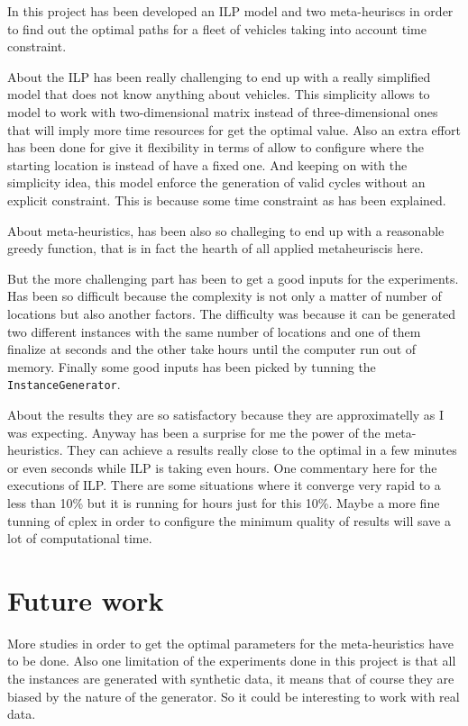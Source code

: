 \documentclass[]{report}
\begin{document}
In this project has been developed an ILP model and two meta-heuriscs in order to find out the optimal paths for a fleet of vehicles taking into account time constraint.

About the ILP has been really challenging to end up with a really simplified model that does not know anything about vehicles. This simplicity allows to model to work with two-dimensional matrix instead of three-dimensional ones that will imply more time resources for get the optimal value. Also an extra effort has been done for give it flexibility in terms of allow to configure where the starting location is instead of have a fixed one. And keeping on with the simplicity idea, this model enforce the generation of valid cycles without an explicit constraint. This is because some time constraint as has been explained.

About meta-heuristics, has been also so challeging to end up with a reasonable greedy function, that is in fact the hearth of all applied metaheuriscis here.

But the more challenging part has been to get a good inputs for the experiments. Has been so difficult because the complexity is not only a matter of number of locations but also another factors. The difficulty was because it can be generated two different instances with the same number of locations and one of them finalize at seconds and the other take hours until the computer run out of memory. Finally some good inputs has been picked by tunning the {\tt InstanceGenerator}.

About the results they are so satisfactory because they are approximatelly as I was expecting. Anyway has been a surprise for me the power of the meta-heuristics. They can achieve a results really close to the optimal in a few minutes or even seconds while ILP is taking even hours. One commentary here for the executions of ILP. There are some situations where it converge very rapid to a less than 10\% but it is running for hours just for this 10\%. Maybe a more fine tunning of cplex in order to configure the minimum quality of results will save a lot of computational time. 

\section{Future work}

More studies in order to get the optimal parameters for the meta-heuristics have to be done. Also one limitation of the experiments done in this project is that all the instances are generated with synthetic data, it means that of course they are biased by the nature of the generator. So it could be interesting to work with real data.
\end{document}
